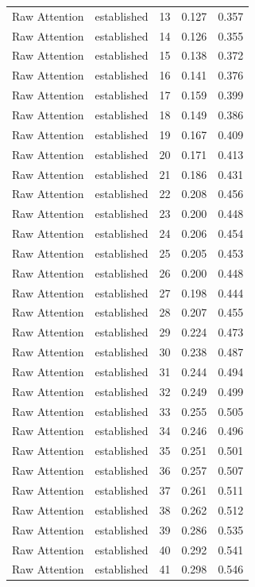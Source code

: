 \begin{tabular}{llrrr}
Raw Attention & established & 13 & 0.127 & 0.357 \\
Raw Attention & established & 14 & 0.126 & 0.355 \\
Raw Attention & established & 15 & 0.138 & 0.372 \\
Raw Attention & established & 16 & 0.141 & 0.376 \\
Raw Attention & established & 17 & 0.159 & 0.399 \\
Raw Attention & established & 18 & 0.149 & 0.386 \\
Raw Attention & established & 19 & 0.167 & 0.409 \\
Raw Attention & established & 20 & 0.171 & 0.413 \\
Raw Attention & established & 21 & 0.186 & 0.431 \\
Raw Attention & established & 22 & 0.208 & 0.456 \\
Raw Attention & established & 23 & 0.200 & 0.448 \\
Raw Attention & established & 24 & 0.206 & 0.454 \\
Raw Attention & established & 25 & 0.205 & 0.453 \\
Raw Attention & established & 26 & 0.200 & 0.448 \\
Raw Attention & established & 27 & 0.198 & 0.444 \\
Raw Attention & established & 28 & 0.207 & 0.455 \\
Raw Attention & established & 29 & 0.224 & 0.473 \\
Raw Attention & established & 30 & 0.238 & 0.487 \\
Raw Attention & established & 31 & 0.244 & 0.494 \\
Raw Attention & established & 32 & 0.249 & 0.499 \\
Raw Attention & established & 33 & 0.255 & 0.505 \\
Raw Attention & established & 34 & 0.246 & 0.496 \\
Raw Attention & established & 35 & 0.251 & 0.501 \\
Raw Attention & established & 36 & 0.257 & 0.507 \\
Raw Attention & established & 37 & 0.261 & 0.511 \\
Raw Attention & established & 38 & 0.262 & 0.512 \\
Raw Attention & established & 39 & 0.286 & 0.535 \\
Raw Attention & established & 40 & 0.292 & 0.541 \\
Raw Attention & established & 41 & 0.298 & 0.546 \\

\end{tabular}
